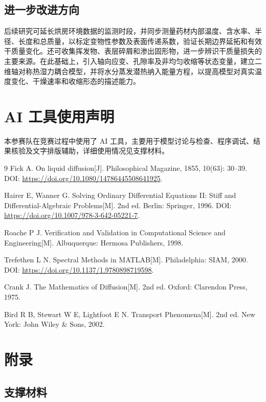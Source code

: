 \documentclass[withoutpreface,bwprint]{cumcmthesis}
\begin{document}
\subsection{进一步改进方向}
后续研究可延长烘房环境数据的监测时段，并同步测量药材内部温度、含水率、半径、长度和总质量，以标定变物性参数及表面传递系数，验证长期边界延拓和有效干质量变化。还可收集挥发物、表层碎屑和渗出固形物，进一步辨识干质量损失的主要来源。在此基础上，引入轴向应变、孔隙率及非均匀收缩等状态变量，建立二维轴对称热湿力耦合模型，并将水分蒸发潜热纳入能量方程，以提高模型对真实温度变化、干燥速率和收缩形态的描述能力。

\section*{AI 工具使用声明}

本参赛队在竞赛过程中使用了 AI 工具，主要用于模型讨论与检查、程序调试、结果核验及文字排版辅助，详细使用情况见支撑材料。


\begin{thebibliography}{9}
Fick A. On liquid diffusion[J]. Philosophical Magazine, 1855, 10(63): 30--39. DOI: \url{https://doi.org/10.1080/14786445508641925}.

Hairer E, Wanner G. Solving Ordinary Differential Equations II: Stiff and Differential-Algebraic Problems[M]. 2nd ed. Berlin: Springer, 1996. DOI: \url{https://doi.org/10.1007/978-3-642-05221-7}.

Roache P J. Verification and Validation in Computational Science and Engineering[M]. Albuquerque: Hermosa Publishers, 1998.

Trefethen L N. Spectral Methods in MATLAB[M]. Philadelphia: SIAM, 2000. DOI: \url{https://doi.org/10.1137/1.9780898719598}.

Crank J. The Mathematics of Diffusion[M]. 2nd ed. Oxford: Clarendon Press, 1975.

Bird R B, Stewart W E, Lightfoot E N. Transport Phenomena[M]. 2nd ed. New York: John Wiley \& Sons, 2002.
\end{thebibliography}

\clearpage
\appendix
\section*{附录}
\setcounter{figure}{0}
\setcounter{table}{0}

\subsection*{支撑材料}
\end{document}
